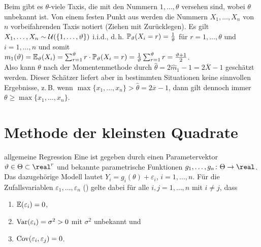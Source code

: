 \begin{Bsp}
    Beim  gibt es $\theta$-viele Taxis, die mit den Nummern
    $1, \dotsc, \theta$ versehen sind, wobei $\theta$ unbekannt ist.
    Von einem festen Punkt aus werden die Nummern $X_1, \dotsc, X_n$ von $n$ vorbeifahrenden
    Taxis notiert (Ziehen mit Zurücklegen).
    Es gilt $X_1, \dotsc, X_n \sim \mathcal{U}(\{1, \dotsc, \vartheta\})$ i.i.d.,
    d.\,h. $\mathbb{P}_\vartheta(X_i = r) = \frac{1}{\vartheta}$ für $r = 1, \dotsc, \theta$ und
    $i = 1, \dotsc, n$ und somit\\
    $m_1(\vartheta) = \mathbb{E}_\vartheta(X_i) = \sum_{r=1}^\vartheta r \cdot \mathbb{P}_\vartheta(X_i = r)
    = \frac{1}{\vartheta} \sum_{r=1}^\vartheta r = \frac{\vartheta + 1}{2}$.\\
    Also kann $\theta$ nach der Momentenmethode durch $\widehat{\theta} = 2\widehat{m}_1 - 1 =
    2\overline{X} - 1$ geschätzt werden.
    Dieser Schätzer liefert aber in bestimmten Situationen keine sinnvollen Ergebnisse, z.\,B.
    wenn $\max\{x_1, \dotsc, x_n\} > \widehat{\theta} = 2\overline{x} - 1$,
    dann gilt dennoch immer $\theta \ge \max\{x_1, \dotsc, x_n\}$.
\end{Bsp}

\section{%
    Methode der kleinsten Quadrate%
}

\begin{Def}{allgemeine Regression}
    Eine  ist gegeben durch einen Parametervektor
    $\theta \in \Theta \subset \real^r$ und bekannte parametrische Funktionen
    $g_1, \dotsc, g_n\colon \Theta \rightarrow \real$.
    Das dazugehörige Modell lautet $Y_i = g_i(\theta) + \varepsilon_i$, $i = 1, \dotsc, n$.
    Für die Zufallsvariablen $\varepsilon_1, \dotsc, \varepsilon_n$ ()
    gelte dabei für alle $i, j = 1, \dotsc, n$ mit $i \not= j$, dass
    \begin{enumerate}
        \item
        $\mathbb{E}(\varepsilon_i) = 0$,

        \item
        $\mathrm{Var}(\varepsilon_i) = \sigma^2 > 0$ mit $\sigma^2$ unbekannt und

        \item
        $\mathrm{Cov}(\varepsilon_i, \varepsilon_j) = 0$.
    \end{enumerate}
\end{Def}

